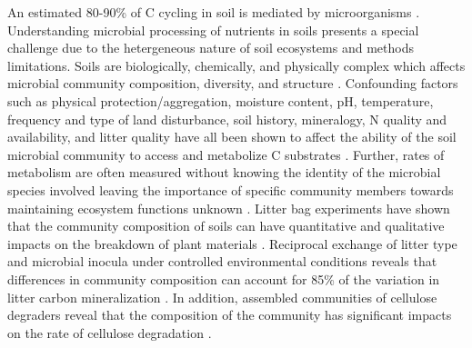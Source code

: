 An estimated 80-90\% of C cycling in soil is mediated by microorganisms \cite{ColemanCrossley_1996,Nannipieri_2003}. Understanding microbial processing of nutrients in soils presents a special challenge due to the hetergeneous nature of soil ecosystems and methods limitations. Soils are biologically, chemically, and physically complex which affects microbial community composition, diversity, and structure \cite{Nannipieri_2003}. Confounding factors such as physical protection/aggregation, moisture content, pH, temperature, frequency and type of land disturbance, soil history, mineralogy, N quality and availability, and litter quality have all been shown to affect the ability of the soil microbial community to access and metabolize C substrates \cite{Sollins_Homann_Caldwell_1996,Kalbitz_2000}. Further, rates of metabolism are often measured without knowing the identity of the microbial species involved \cite{ndi_Pietramellara_Renella_2003} leaving the importance of specific community members towards maintaining ecosystem functions unknown \cite{Allison_2008,ndi_Pietramellara_Renella_2003,Schimel_2012}. Litter bag experiments have shown that the community composition of soils can have quantitative and qualitative impacts on the breakdown of plant materials \cite{Schimel_1995}. Reciprocal exchange of litter type and microbial inocula under controlled environmental conditions reveals that differences in community composition can account for 85\% of the variation in litter carbon mineralization \cite{Strickland_2009}. In addition, assembled communities of cellulose degraders reveal that the composition of the community has significant impacts on the rate of cellulose degradation \cite{Wohl_2004}. 


